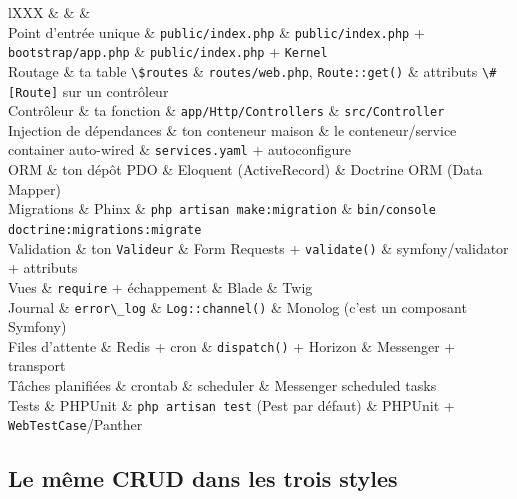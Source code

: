 \begin{tabz}{lXXX}
  \headrow {} \&  \&  \&  \\
  \midrule
  Point d'entr\'ee unique \& \verb|public/index.php| \& \verb|public/index.php| + \verb|bootstrap/app.php| \& \verb|public/index.php| + \verb|Kernel| \\
  Routage \& ta table \verb|\$routes| \& \verb|routes/web.php|, \verb|Route::get()| \& attributs \verb|\#[Route]| sur un contr\^oleur \\
  Contr\^oleur \& ta fonction \& \verb|app/Http/Controllers| \& \verb|src/Controller| \\
  Injection de d\'ependances \& ton conteneur maison \& le conteneur/service container auto-wired \& \verb|services.yaml| + autoconfigure \\
  ORM \& ton d\'ep\^ot PDO \& Eloquent (ActiveRecord) \& Doctrine ORM (Data Mapper) \\
  Migrations \& Phinx \& \verb|php artisan make:migration| \& \verb|bin/console doctrine:migrations:migrate| \\
  Validation \& ton \verb|Valideur| \& Form Requests + \verb|validate()| \& symfony/validator + attributs \\
  Vues \& \verb|require| + \'echappement \& Blade \& Twig \\
  Journal \& \verb|error\_log| \& \verb|Log::channel()| \& Monolog (c'est un composant Symfony) \\
  Files d'attente \& Redis + cron \& \verb|dispatch()| + Horizon \& Messenger + transport \\
  T\^aches planifi\'ees \& crontab \& scheduler \& Messenger scheduled tasks \\
  Tests \& PHPUnit \& \verb|php artisan test| (Pest par d\'efaut) \& PHPUnit + \verb|WebTestCase|/Panther \\
\end{tabz}

\subsection{Le m\^eme CRUD dans les trois styles}


